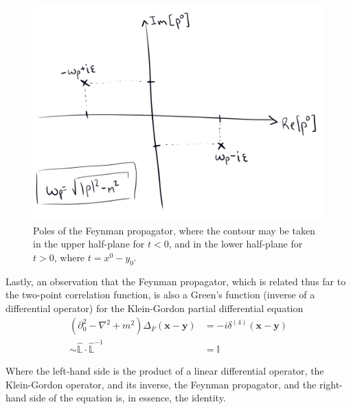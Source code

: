 \begin{figure}[H]
	\centering
	\includegraphics[scale=0.5]{poles.png}
	\caption{Poles of the Feynman propagator, where the contour may be taken in the upper half-plane for $t<0$, and in the lower half-plane for $t>0$, where $t=x^0-y_0$.}
\end{figure}

\noindent Lastly, an observation that the Feynman propagator, which is related thus far to the two-point correlation function, is also a Green's function (inverse of a differential operator) for the Klein-Gordon partial differential equation
\begin{align}
(\partial_0^2 - \nabla^2 + m^2) \Delta_F(\textbf{x} - \textbf{y}) &= -i \delta^{(4)} (\textbf{x} - \textbf{y}) \\
\sim \hat{\mathbb{L}} \cdot \hat{\mathbb{L}}^{-1} &= \mathbb{I}
\end{align}

\noindent Where the left-hand side is the product of a linear differential operator, the Klein-Gordon operator, and its inverse, the Feynman propagator, and the right-hand side of the equation is, in essence, the identity.